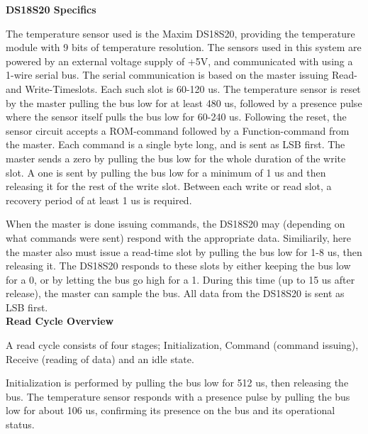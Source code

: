 \documentclass[a4paper,11pt]{article}
\begin{document}
{\noindent \bf DS18S20 Specifics}

The temperature sensor used is the Maxim DS18S20, providing the temperature module with
9 bits of temperature resolution. The sensors used in this system are powered by an external
voltage supply of +5V, and communicated with using a 1-wire serial bus. The serial communication is
based on the master issuing Read- and Write-Timeslots. Each such slot is 60-120 us. The temperature
sensor is reset by the master pulling the bus low for at least 480 us, followed by a presence pulse
where the sensor itself pulls the bus low for 60-240 us. Following the reset, the sensor circuit accepts
a ROM-command followed by a Function-command from the master. Each command is a single byte long, and is
sent as LSB first. The master sends a zero by pulling the bus low for the whole duration of the write slot.
A one is sent by pulling the bus low for a minimum of 1 us and then releasing it for the rest of the
write slot. Between each write or read slot, a recovery period of at least 1 us is required.

When the master is done issuing commands, the DS18S20 may (depending on what commands were sent) respond
with the appropriate data. Similiarily, here the master also must issue a read-time slot by pulling the 
bus low for 1-8 us, then releasing it. The DS18S20 responds to these slots by either keeping the bus
low for a 0, or by letting the bus go high for a 1. During this time (up to 15 us after release), the
master can sample the bus. All data from the DS18S20 is sent as LSB first.\\

{\noindent \bf Read Cycle Overview}

A read cycle consists of four stages; Initialization, Command (command issuing), Receive (reading of data) and an idle state.

Initialization is performed by pulling the bus low for 512 us, then releasing the bus. The
temperature sensor responds with a presence pulse by pulling the bus low for about 106 us, confirming
its presence on the bus and its operational status. 
\end{document}
